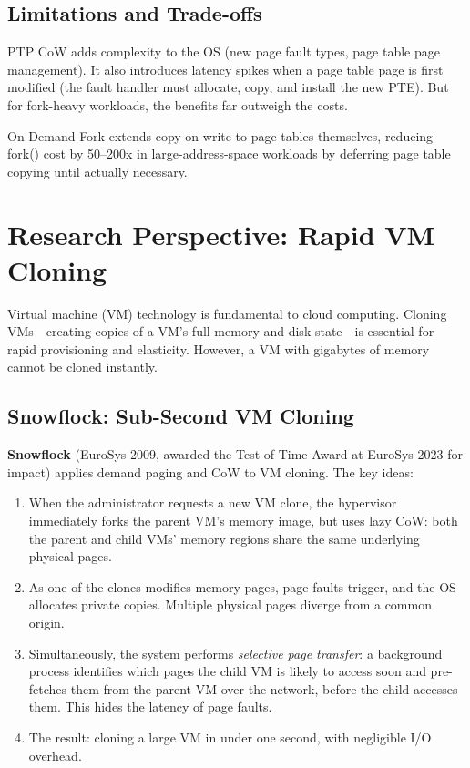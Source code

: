 \documentclass[11pt]{article}
\begin{document}
\subsection{Limitations and Trade-offs}

PTP CoW adds complexity to the OS (new page fault types, page table page management). It also introduces latency spikes when a page table page is first modified (the fault handler must allocate, copy, and install the new PTE). But for fork-heavy workloads, the benefits far outweigh the costs.

\begin{keyidea}
On-Demand-Fork extends copy-on-write to page tables themselves, reducing fork() cost by 50--200x in large-address-space workloads by deferring page table copying until actually necessary.
\end{keyidea}

\section{Research Perspective: Rapid VM Cloning}

Virtual machine (VM) technology is fundamental to cloud computing. Cloning VMs---creating copies of a VM's full memory and disk state---is essential for rapid provisioning and elasticity. However, a VM with gigabytes of memory cannot be cloned instantly.

\subsection{Snowflock: Sub-Second VM Cloning}

\textbf{Snowflock} (EuroSys 2009, awarded the Test of Time Award at EuroSys 2023 for impact) applies demand paging and CoW to VM cloning. The key ideas:

\begin{enumerate}
    \item When the administrator requests a new VM clone, the hypervisor immediately forks the parent VM's memory image, but uses lazy CoW: both the parent and child VMs' memory regions share the same underlying physical pages.
    \item As one of the clones modifies memory pages, page faults trigger, and the OS allocates private copies. Multiple physical pages diverge from a common origin.
    \item Simultaneously, the system performs \emph{selective page transfer}: a background process identifies which pages the child VM is likely to access soon and pre-fetches them from the parent VM over the network, before the child accesses them. This hides the latency of page faults.
    \item The result: cloning a large VM in under one second, with negligible I/O overhead.
\end{enumerate}
\end{document}
